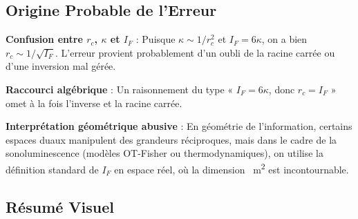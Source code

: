 \documentclass[a4paper,12pt]{article}
\begin{document}
\subsection{Origine Probable de l'Erreur}
\item \textbf{Confusion entre \( r_c \), \( \kappa \) et \( I_F \)} :
    Puisque \( \kappa \sim 1/r_c^2 \) et \( I_F = 6\kappa \), on a bien \( r_c \sim 1/\sqrt{I_F} \).
    L’erreur provient probablement d’un oubli de la racine carrée ou d’une inversion mal gérée.

    \item \textbf{Raccourci algébrique} :
    Un raisonnement du type « \( I_F = 6\kappa \), donc \( r_c = I_F \) » omet à la fois l’inverse et la racine carrée.

    \item \textbf{Interprétation géométrique abusive} :
    En géométrie de l’information, certains espaces duaux manipulent des grandeurs réciproques,
    mais dans le cadre de la sonoluminescence (modèles OT-Fisher ou thermodynamiques),
    on utilise la définition standard de \( I_F \) en espace réel, où la dimension \si{\per\meter\squared} est incontournable.

\subsection{Résumé Visuel}
\begin{table}[h]
\centering
{}
\caption{Résumé des quantités physiques en sonoluminescence. La relation correcte est \( r_c \sim 1/\sqrt{I_F} \). 
L’égalité \( r_c = I_F \) est incohérente (\si{\meter} \(\neq\) \si{\per\meter\squared}) et prédit un comportement inverse à celui observé lors du collapse.}
\label{tab:resume}
\end{table}
\end{document}
